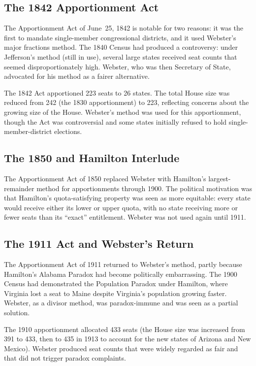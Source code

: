 \subsection{The 1842 Apportionment Act}

The Apportionment Act of June~25, 1842 \citep{apportionment1842}
is notable for two reasons: it was the first to mandate
single-member congressional districts, and it used Webster's
major fractions method.
The 1840 Census had produced a controversy: under Jefferson's method
(still in use), several large states received seat counts that seemed
disproportionately high.
Webster, who was then Secretary of State, advocated for his method
as a fairer alternative.

The 1842 Act apportioned 223 seats to 26 states.
The total House size was reduced from 242 (the 1830 apportionment)
to 223, reflecting concerns about the growing size of the House.
Webster's method was used for this apportionment, though the Act
was controversial and some states initially refused to hold
single-member-district elections.

\subsection{The 1850 and Hamilton Interlude}

The Apportionment Act of 1850 replaced Webster with Hamilton's
largest-remainder method for apportionments through 1900.
The political motivation was that Hamilton's quota-satisfying
property was seen as more equitable: every state would receive either
its lower or upper quota, with no state receiving more or fewer seats
than its ``exact'' entitlement.
Webster was not used again until 1911.

\subsection{The 1911 Act and Webster's Return}

The Apportionment Act of 1911 \citep{apportionment1911} returned to
Webster's method, partly because Hamilton's Alabama Paradox
had become politically embarrassing.
The 1900 Census had demonstrated the Population Paradox under Hamilton,
where Virginia lost a seat to Maine despite Virginia's population
growing faster.
Webster, as a divisor method, was paradox-immune and was seen as a
partial solution.

The 1910 apportionment allocated 433 seats (the House size was increased
from 391 to 433, then to 435 in 1913 to account for the new states
of Arizona and New Mexico).
Webster produced seat counts that were widely regarded as fair
and that did not trigger paradox complaints.

